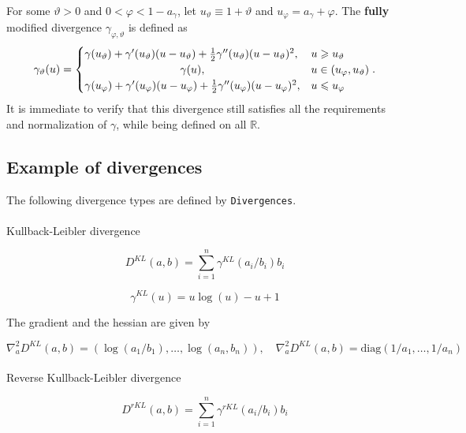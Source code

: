 \documentclass[
  letterpaper,
  DIV=11,
  numbers=noendperiod]{scrartcl}
\makeatletter
\let\oldparagraph\paragraph
\renewcommand{\paragraph}{
    \@ifstar
      \xxxParagraphStar
      \xxxParagraphNoStar
  }
\newcommand{\xxxParagraphStar}[1]{\oldparagraph*{#1}\mbox{}}
\newcommand{\xxxParagraphNoStar}[1]{\oldparagraph{#1}\mbox{}}
\makeatother
\begin{document}
For some \(\vartheta>0\) and \(0 < \varphi < 1-a_{\gamma}\), let
\(u_{\vartheta}\equiv
1+\vartheta\) and \(u_{\varphi} = a_{\gamma} + \varphi\). The
\textbf{fully} modified divergence \(\gamma_{\varphi, \vartheta}\) is
defined as \[
\gamma_{\vartheta}(u) = \begin{cases}
  \gamma(u_{\vartheta}) + \gamma'(u_{\vartheta})(u-u_{\vartheta}) + \frac{1}{2}\gamma''(u_{\vartheta})(u-u_{\vartheta})^2, & u\geqslant u_{\vartheta}\\
  \newline\gamma(u), & u\in (u_{\varphi},u_{\vartheta})\\
  \newline    \gamma(u_{\varphi}) + \gamma'(u_{\varphi})(u-u_{\varphi}) + \frac{1}{2}\gamma''(u_{\varphi})(u-u_{\varphi})^2, & u\leqslant u_{\varphi}\\
\end{cases}.
\] It is immediate to verify that this divergence still satisfies all
the requirements and normalization of \(\gamma\), while being defined on
all \(\mathbb{R}\).

\subsection{Example of divergences}\label{example-of-divergences}

The following divergence types are defined by \texttt{Divergences}.

\paragraph{Kullback-Leibler
divergence}\label{kullback-leibler-divergence}

\[
D^{KL}(a,b) = \sum_{i=1}^n \gamma^{KL}(a_i/b_i) b_i
\]

\[
\gamma^{KL}(u) = u\log(u) - u + 1
\]

The gradient and the hessian are given by

\[
\nabla_{a}^{2}D^{KL}(a,b) = \left(\log(a_1/b_1),\ldots,\log(a_n,b_n)
\right), \quad \nabla_{a}^{2}D^{KL}(a,b) = \mathrm{diag}(1/a_1, \ldots, 1/a_n)
\]

\paragraph{Reverse Kullback-Leibler
divergence}\label{reverse-kullback-leibler-divergence}

\[
D^{rKL}(a,b) = \sum_{i=1}^n \gamma^{rKL}(a_i/b_i) b_i
\]
\end{document}
